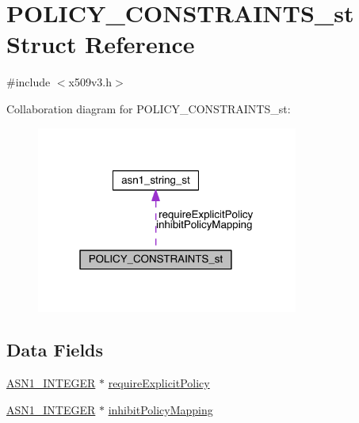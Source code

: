 \hypertarget{struct_p_o_l_i_c_y___c_o_n_s_t_r_a_i_n_t_s__st}{}\section{P\+O\+L\+I\+C\+Y\+\_\+\+C\+O\+N\+S\+T\+R\+A\+I\+N\+T\+S\+\_\+st Struct Reference}
\label{struct_p_o_l_i_c_y___c_o_n_s_t_r_a_i_n_t_s__st}


{\ttfamily \#include $<$x509v3.\+h$>$}



Collaboration diagram for P\+O\+L\+I\+C\+Y\+\_\+\+C\+O\+N\+S\+T\+R\+A\+I\+N\+T\+S\+\_\+st\+:\nopagebreak
\begin{figure}[H]
\begin{center}
\leavevmode
\includegraphics[width=244pt]{struct_p_o_l_i_c_y___c_o_n_s_t_r_a_i_n_t_s__st__coll__graph}
\end{center}
\end{figure}
\subsection*{Data Fields}
\begin{DoxyCompactItemize}
\item 
\hyperlink{crypto_2ossl__typ_8h_af4335399bf9774cb410a5e93de65998b}{A\+S\+N1\+\_\+\+I\+N\+T\+E\+G\+ER} $\ast$ \hyperlink{struct_p_o_l_i_c_y___c_o_n_s_t_r_a_i_n_t_s__st_a5ce9b26a023809363f71537169d803e3}{require\+Explicit\+Policy}
\item 
\hyperlink{crypto_2ossl__typ_8h_af4335399bf9774cb410a5e93de65998b}{A\+S\+N1\+\_\+\+I\+N\+T\+E\+G\+ER} $\ast$ \hyperlink{struct_p_o_l_i_c_y___c_o_n_s_t_r_a_i_n_t_s__st_a5e04c8ec615246f32aa32c1b5036b7d4}{inhibit\+Policy\+Mapping}
\end{DoxyCompactItemize}


